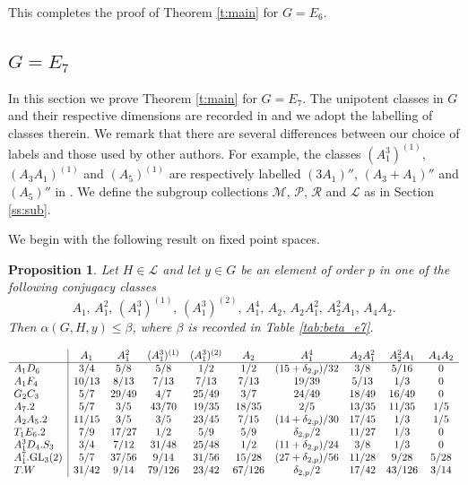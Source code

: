 \documentclass[twoside,a4paper,reqno,11pt]{amsart}
\renewcommand{\a}{\alpha}
\renewcommand{\b}{\beta}
\newcommand{\<}{\langle}
\renewcommand{\>}{\rangle}
\newcommand{\leqs}{\leqslant}
\renewcommand{\:}{\colon}
\theoremstyle{plain}
\newtheorem{prop}[thm]{Proposition}
\theoremstyle{definition}
\begin{document}
This completes the proof of Theorem \ref{t:main} for $G = E_6$.

\subsection{$G = E_7$}\label{ss:e7}

In this section we prove Theorem \ref{t:main} for $G = E_7$. The unipotent classes in $G$ and their respective dimensions are recorded in \cite[Table 22.1.2]{LS_book} and we adopt the labelling of classes therein. We remark that there are several differences between our choice of labels and those used by other authors. For example, the classes $(A_1^3)^{(1)}$, $(A_3A_1)^{(1)}$ and $(A_5)^{(1)}$ are respectively labelled $(3A_1)''$, $(A_3+A_1)''$ and $(A_5)''$ in \cite{Law2,Law1,Spal}. We define the subgroup collections $\mathcal{M}$, $\mathcal{P}$, $\mathcal{R}$ and $\mathcal{L}$ as in Section \ref{ss:sub}. 

We begin with the following result on fixed point spaces.

\begin{prop}\label{p:e7_dim3}
Let $H \in \mathcal{L}$ and let $y \in G$ be an element of order $p$ in one of the following conjugacy classes
\[
A_1, \, A_1^2, \, (A_1^3)^{(1)}, \, (A_1^3)^{(2)}, \, A_1^4, \, A_2, \, A_2A_1^2, \, A_2^2A_1, \, A_4A_2.
\]
Then $\a(G,H,y) \leqs \b$, where $\b$ is recorded in Table \ref{tab:beta_e7}.
\end{prop}

{\small
\begin{table}
\[
\begin{array}{l|ccccccccc}
& A_1 & A_1^2 & (A_1^3)^{(1)} & (A_1^3)^{(2)} & A_2 & A_1^4 & A_2A_1^2 & A_2^2A_1 & A_4A_2 \\ \hline
A_1D_6 & 3/4 & 5/8 & 5/8 & 1/2 & 1/2 & (15+\delta_{2,p})/32 & 3/8 & 5/16 & 0 \\
A_1F_4 & 10/13 & 8/13 & 7/13 & 7/13 & 7/13 & 19/39 & 5/13 & 1/3 & 0 \\
G_2C_3 & 5/7 & 29/49 & 4/7 & 25/49 & 3/7 & 24/49 & 18/49 & 16/49 & 0 \\
A_7.2 & 5/7 & 3/5 & 43/70 & 19/35 & 18/35 & 2/5 & 13/35 & 11/35 &1/5 \\
A_2A_5.2 & 11/15 & 3/5 & 3/5 & 23/45 & 7/15 & (14+\delta_{2,p})/30 & 17/45 & 1/3 & 1/5 \\
T_1E_6.2 & 7/9 & 17/27 & 1/2 & 5/9 & 5/9 & \delta_{2,p}/2 & 11/27 & 1/3 & 0 \\
A_1^3D_4.S_3 & 3/4 & 7/12 & 31/48 & 25/48 & 1/2 & (11+\delta_{2,p})/24 & 3/8 & 1/3 & 0 \\
A_1^7.{\rm GL}_3(2) & 5/7 & 37/56 & 9/14 & 31/56 & 15/28 & (27+\delta_{2,p})/56 & 11/28 & 9/28 & 5/28 \\
T.W & 31/42 & 9/14 & 79/126 & 23/42 & 67/126 & \delta_{2,p}/2 & 17/42 & 43/126 & 3/14 \\ 
\end{array}
\]
\caption{The upper bound $\a(G,H,y) \leqs \b$ in Proposition \ref{p:e7_dim3}}
\label{tab:beta_e7}
\end{table}}
\end{document}
